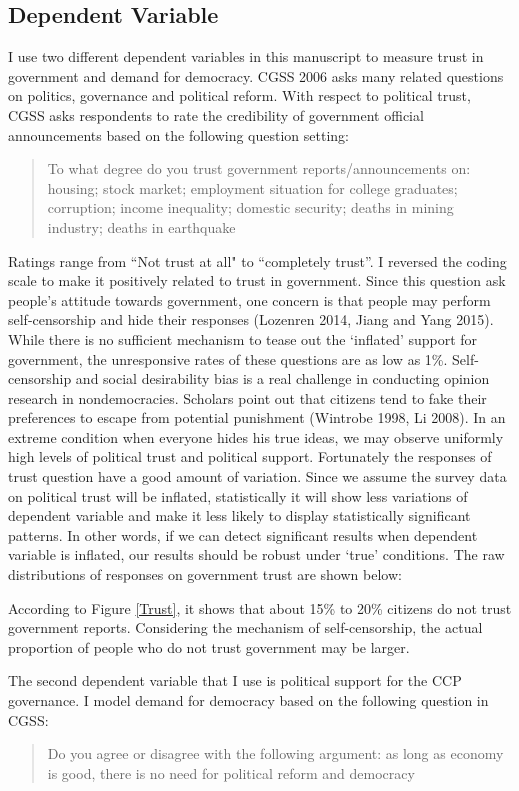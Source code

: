 \documentclass[12pt]{article}\usepackage[]{graphicx}\usepackage[]{color}
\begin{document}
\subsection{Dependent Variable}
I use two different dependent variables in this manuscript to measure trust in government and demand for democracy. CGSS 2006 asks many related questions on politics, governance and political reform. With respect to political trust, CGSS asks respondents to rate the credibility of government official announcements based on the following question setting:
\begin{quotation}
	To what degree do you trust government reports/announcements on: housing; stock market; employment situation for college graduates; corruption; income inequality; domestic security; deaths in mining industry; deaths in earthquake
\end{quotation} 
Ratings range from ``Not trust at all" to ``completely trust''. I reversed the coding scale to make it positively related to trust in government. 
Since this question ask people's attitude towards government, one concern is that people may perform self-censorship and hide their responses (Lozenren 2014, Jiang and Yang 2015). While there is no sufficient mechanism to tease out the `inflated' support for government, the unresponsive rates of these questions are as low as 1\%. Self-censorship and social desirability bias is a real challenge in conducting opinion research in nondemocracies. Scholars point out that citizens tend to fake their preferences to escape from potential punishment (Wintrobe 1998, Li 2008). In an extreme condition when everyone hides his true ideas, we may observe uniformly high levels of political trust and political support. Fortunately the responses of trust question have a good amount of variation. Since we assume the survey data on political trust will be inflated, statistically it will show less variations of dependent variable and make it less likely to display statistically significant patterns. In other words, if we can detect significant results when dependent variable is inflated, our results should be robust under `true' conditions. The raw distributions of responses on government trust are shown below:

According to Figure \ref{Trust}, it shows that about 15\% to 20\% citizens do not trust government reports. Considering the mechanism of self-censorship, the actual proportion of people who do not trust government may be larger.

The second dependent variable that I use is political support for the CCP governance. I model demand for democracy based on the following question in CGSS:
\begin{quotation}
	Do you agree or disagree with the following argument: as long as economy is good, there is no need for political reform and democracy
\end{quotation}
\end{document}
